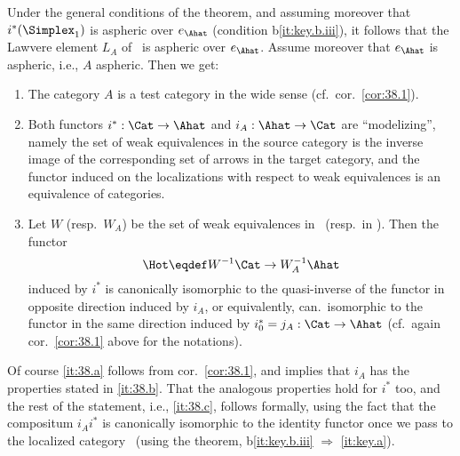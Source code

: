 \begin{corollarynum}\label{cor:38.2}
  Under the general conditions of the theorem, and assuming moreover
  that $i^*(\Simplex_1)$ is aspheric over $e_\Ahat$ \textup(condition
  \textup{b\ref{it:key.b.iii})}, it follows that the Lawvere element $L_A$ of
  \Ahat\ is aspheric over $e_\Ahat$. Assume moreover that $e_\Ahat$ is
  aspheric, i.e., $A$ aspheric. Then we get:
  \begin{enumerate}[label=\alph*),font=\normalfont]
  \item\label{it:38.a}
    The category $A$ is a test category in the wide sense \textup(cf.\
    cor.\ \textup{\ref{cor:38.1})}.
  \item\label{it:38.b}
    Both functors $i^* : \Cat\to\Ahat$ and $i_A:\Ahat\to\Cat$ are
    ``modelizing'', namely the set of weak equivalences in the source
    category is the inverse image of the corresponding set of arrows
    in the target category, and the functor induced on the
    localizations with respect to weak equivalences is an equivalence
    of categories.
  \item\label{it:38.c}
    Let $W$ \textup(resp.\ $W_A$\textup) be the set of weak
    equivalences in \Cat\ \textup(resp.\ in \Ahat\textup). Then the
    functor
    \[\Hot \eqdef W^{-1}\Cat \to W_A^{-1}\Ahat\]
    induced by $i^*$ is canonically isomorphic to the quasi-inverse of
    the functor in opposite direction induced by $i_A$, or
    equivalently, can.\ isomorphic to the functor in the same
    direction induced by $i_0^*=j_A:\Cat\to\Ahat$ \textup(cf.\ again
    cor.\ \textup{\ref{cor:38.1}} above for the notations\textup).
  \end{enumerate}
\end{corollarynum}

Of course \ref{it:38.a} follows from cor.\ \ref{cor:38.1}, and implies
that $i_A$ has the properties stated in \ref{it:38.b}. That the
analogous properties hold for $i^*$ too, and the rest of the
statement, i.e., \ref{it:38.c}, follows formally, using the fact that
the compositum $i_Ai^*$ is canonically isomorphic to the identity
functor once we pass to the localized category \Hot\ (using the
theorem, b\ref{it:key.b.iii} $\Rightarrow$ \ref{it:key.a}).

